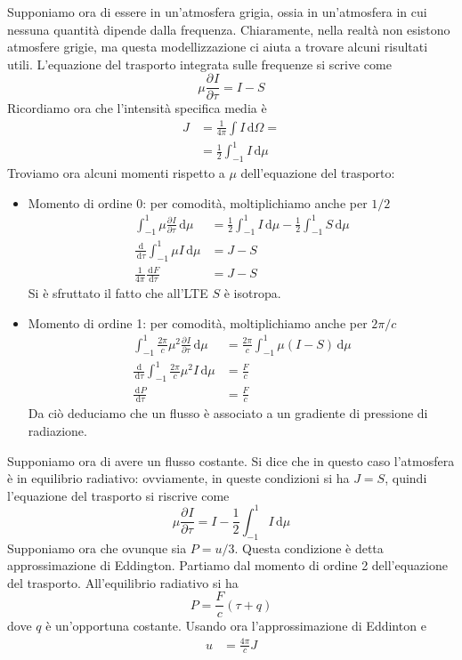 \documentclass[a4paper,11pt]{article}
\renewcommand{\d}{\mathrm{d}} %
\newcommand{\der}[3][]{\frac{\d ^{#1}#2}{\d {#3}^{#1}}} %
\newcommand{\pder}[3][]{\frac{\partial ^{#1}#2}{\partial {#3}^{#1}}} %
\renewcommand{\d}{\,\mathrm{d}}
\theoremstyle{theorem}
\theoremstyle{definition}
\begin{document}
\begin{itemize}
	\noindent Supponiamo ora di essere in un'atmosfera grigia, ossia in un'atmosfera in cui nessuna quantità dipende dalla frequenza. Chiaramente, nella realtà non esistono atmosfere grigie, ma questa modellizzazione ci aiuta a trovare alcuni risultati utili. L'equazione del trasporto integrata sulle frequenze si scrive come
	\[\mu\pder{I}{\tau}=I-S\]
	Ricordiamo ora che l'intensità specifica media è
	\begin{align*}J&=\frac{1}{4\pi}\int I\d\Omega=\\&=\frac{1}{2}\int_{-1}^{1}I\d\mu\end{align*}
	Troviamo ora alcuni momenti rispetto a $\mu$ dell'equazione del trasporto:
	\begin{itemize}
		\item Momento di ordine 0: per comodità, moltiplichiamo anche per $1/2$
		\begin{align*}
			\int_{-1}^{1}\mu\pder{I}{\tau}\d\mu&=\frac{1}{2}\int_{-1}^{1}I\d\mu-\frac{1}{2}\int_{-1}^{1}S\d\mu\\\der{}{\tau}\int_{-1}^{1}\mu I\d\mu&=J-S\\
			\frac{1}{4\pi}\der{F}{\tau}&=J-S
		\end{align*}
		Si è sfruttato il fatto che all'LTE $S$ è isotropa.
		\item Momento di ordine 1: per comodità, moltiplichiamo anche per $2\pi/c$
		\begin{align*}
			\int_{-1}^{1}\frac{2\pi}{c}\mu^2\pder{I}{\tau}\d\mu&=\frac{2\pi}{c}\int_{-1}^{1}\mu\left(I-S\right)\d\mu\\
			\der{}{\tau}\int_{-1}^{1}\frac{2\pi}{c}\mu^2 I\d\mu&=\frac{F}{c}\\
			\der{P}{\tau}&=\frac{F}{c}
		\end{align*}
		Da ciò deduciamo che un flusso è associato a un gradiente di pressione di radiazione.
	\end{itemize}
	Supponiamo ora di avere un flusso costante. Si dice che in questo caso l'atmosfera è in equilibrio radiativo: ovviamente, in queste condizioni si ha $J=S$, quindi l'equazione del trasporto si riscrive come
	\[\mu\pder{I}{\tau}=I-\frac{1}{2}\int_{-1}^{1}I\d\mu\]
	Supponiamo ora che ovunque sia $P=u/3$. Questa condizione è detta approssimazione di Eddington. Partiamo dal momento di ordine 2 dell'equazione del trasporto. All'equilibrio radiativo si ha
	\[P=\frac{F}{c}(\tau+q)\]
	dove $q$ è un'opportuna costante. Usando ora l'approssimazione di Eddinton e
	\begin{align*}
		u&=\frac{4\pi}{c}J\\

\end{align*}
\end{itemize}
\end{document}
